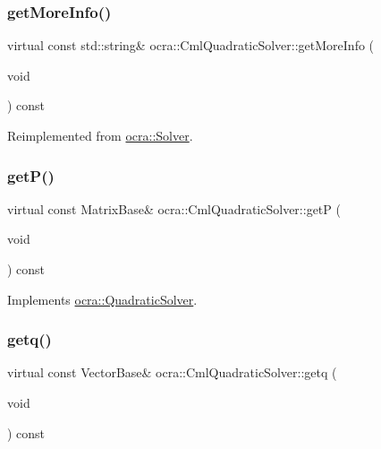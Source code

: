 \subsubsection{\texorpdfstring{get\+More\+Info()}{getMoreInfo()}}
{\footnotesize\ttfamily virtual const std\+::string\& ocra\+::\+Cml\+Quadratic\+Solver\+::get\+More\+Info (\begin{DoxyParamCaption}\item[{void}]{ }\end{DoxyParamCaption}) const\hspace{0.3cm}{\ttfamily [virtual]}}



Reimplemented from \hyperlink{classocra_1_1Solver_a3ebcf70ad5466cd31f27811ad6ccdfff}{ocra\+::\+Solver}.

\hypertarget{classocra_1_1CmlQuadraticSolver_a2d02c9af54a4456eac7e56803ee037f3}{}\label{classocra_1_1CmlQuadraticSolver_a2d02c9af54a4456eac7e56803ee037f3} 
\subsubsection{\texorpdfstring{get\+P()}{getP()}}
{\footnotesize\ttfamily virtual const Matrix\+Base\& ocra\+::\+Cml\+Quadratic\+Solver\+::getP (\begin{DoxyParamCaption}\item[{void}]{ }\end{DoxyParamCaption}) const\hspace{0.3cm}{\ttfamily [virtual]}}



Implements \hyperlink{classocra_1_1QuadraticSolver_a4dcc2768227c21262571d19c0d494935}{ocra\+::\+Quadratic\+Solver}.

\hypertarget{classocra_1_1CmlQuadraticSolver_ac97f9655bd9a6d8564539cf7ec79c269}{}\label{classocra_1_1CmlQuadraticSolver_ac97f9655bd9a6d8564539cf7ec79c269} 
\subsubsection{\texorpdfstring{getq()}{getq()}}
{\footnotesize\ttfamily virtual const Vector\+Base\& ocra\+::\+Cml\+Quadratic\+Solver\+::getq (\begin{DoxyParamCaption}\item[{void}]{ }\end{DoxyParamCaption}) const\hspace{0.3cm}{\ttfamily [virtual]}}



